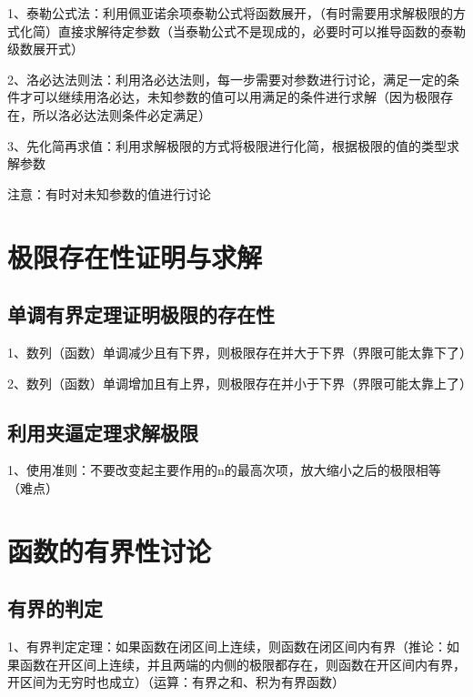 1、泰勒公式法：利用佩亚诺余项泰勒公式将函数展开，（有时需要用求解极限的方式化简）直接求解待定参数（当泰勒公式不是现成的，必要时可以推导函数的泰勒级数展开式）

2、洛必达法则法：利用洛必达法则，每一步需要对参数进行讨论，满足一定的条件才可以继续用洛必达，未知参数的值可以用满足的条件进行求解（因为极限存在，所以洛必达法则条件必定满足）

3、先化简再求值：利用求解极限的方式将极限进行化简，根据极限的值的类型求解参数

注意：有时对未知参数的值进行讨论

\section{极限存在性证明与求解}



\subsection{单调有界定理证明极限的存在性}

1、数列（函数）单调减少且有下界，则极限存在并大于下界（界限可能太靠下了）

2、数列（函数）单调增加且有上界，则极限存在并小于下界（界限可能太靠上了）



\subsection{利用夹逼定理求解极限}

1、使用准则：不要改变起主要作用的n的最高次项，放大缩小之后的极限相等（难点）

\section{函数的有界性讨论}



\subsection{有界的判定}

1、有界判定定理：如果函数在闭区间上连续，则函数在闭区间内有界（推论：如果函数在开区间上连续，并且两端的内侧的极限都存在，则函数在开区间内有界，开区间为无穷时也成立）（运算：有界之和、积为有界函数）

